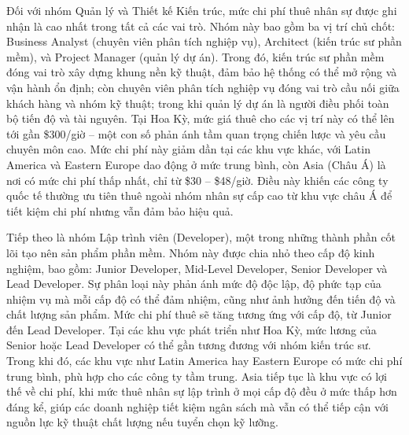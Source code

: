    \begin{flushleft}
      \hspace*{0.8cm}Đối với nhóm Quản lý và Thiết kế Kiến trúc, mức chi phí thuê nhân sự được ghi nhận là cao nhất trong tất cả các vai trò. Nhóm này bao gồm ba vị trí chủ chốt: Business Analyst (chuyên viên phân tích nghiệp vụ), Architect (kiến trúc sư phần mềm), và Project Manager (quản lý dự án). Trong đó, kiến trúc sư phần mềm đóng vai trò xây dựng khung nền kỹ thuật, đảm bảo hệ thống có thể mở rộng và vận hành ổn định; còn chuyên viên phân tích nghiệp vụ đóng vai trò cầu nối giữa khách hàng và nhóm kỹ thuật; trong khi quản lý dự án là người điều phối toàn bộ tiến độ và tài nguyên. Tại Hoa Kỳ, mức giá thuê cho các vị trí này có thể lên tới gần \$300/giờ – một con số phản ánh tầm quan trọng chiến lược và yêu cầu chuyên môn cao. Mức chi phí này giảm dần tại các khu vực khác, với Latin America và Eastern Europe dao động ở mức trung bình, còn Asia (Châu Á) là nơi có mức chi phí thấp nhất, chỉ từ \$30 – \$48/giờ. Điều này khiến các công ty quốc tế thường ưu tiên thuê ngoài nhóm nhân sự cấp cao từ khu vực châu Á để tiết kiệm chi phí nhưng vẫn đảm bảo hiệu quả.
    \end{flushleft}

    \begin{flushleft}
      \hspace*{0.8cm}Tiếp theo là nhóm Lập trình viên (Developer), một trong những thành phần cốt lõi tạo nên sản phẩm phần mềm. Nhóm này được chia nhỏ theo cấp độ kinh nghiệm, bao gồm: Junior Developer, Mid-Level Developer, Senior Developer và Lead Developer. Sự phân loại này phản ánh mức độ độc lập, độ phức tạp của nhiệm vụ mà mỗi cấp độ có thể đảm nhiệm, cũng như ảnh hưởng đến tiến độ và chất lượng sản phẩm. Mức chi phí thuê sẽ tăng tương ứng với cấp độ, từ Junior đến Lead Developer. Tại các khu vực phát triển như Hoa Kỳ, mức lương của Senior hoặc Lead Developer có thể gần tương đương với nhóm kiến trúc sư. Trong khi đó, các khu vực như Latin America hay Eastern Europe có mức chi phí trung bình, phù hợp cho các công ty tầm trung. Asia tiếp tục là khu vực có lợi thế về chi phí, khi mức thuê nhân sự lập trình ở mọi cấp độ đều ở mức thấp hơn đáng kể, giúp các doanh nghiệp tiết kiệm ngân sách mà vẫn có thể tiếp cận với nguồn lực kỹ thuật chất lượng nếu tuyển chọn kỹ lưỡng.
    \end{flushleft}


